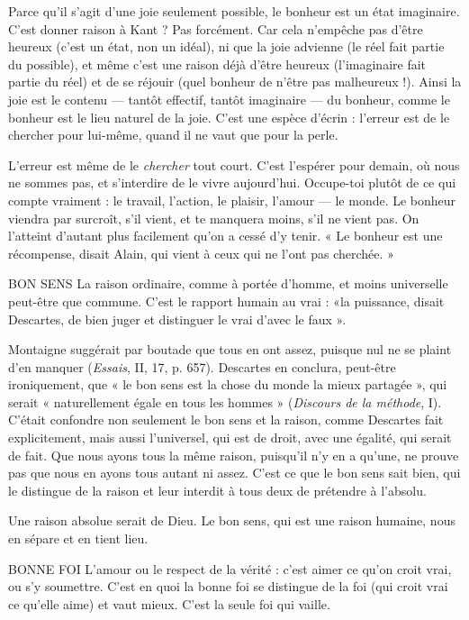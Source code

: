 Parce qu’il s’agit d’une joie seulement possible, le bonheur est un état imaginaire.
C’est donner raison à Kant ? Pas forcément. Car cela n’empêche pas
d’être heureux (c’est un état, non un idéal), ni que la joie advienne (le réel fait
partie du possible), et même c’est une raison déjà d’être heureux (l’imaginaire
fait partie du réel) et de se réjouir (quel bonheur de n’être pas malheureux !).
Ainsi la joie est le contenu — tantôt effectif, tantôt imaginaire — du bonheur,
comme le bonheur est le lieu naturel de la joie. C’est une espèce d’écrin :
l'erreur est de le chercher pour lui-même, quand il ne vaut que pour la perle.

L'erreur est même de le {\it chercher} tout court. C’est l’espérer pour demain,
où nous ne sommes pas, et s’interdire de le vivre aujourd’hui. Occupe-toi
plutôt de ce qui compte vraiment : le travail, l’action, le plaisir, l'amour — le
monde. Le bonheur viendra par surcroît, s’il vient, et te manquera moins, s’il
ne vient pas. On l’atteint d’autant plus facilement qu’on a cessé d’y tenir. « Le
bonheur est une récompense, disait Alain, qui vient à ceux qui ne l’ont pas
cherchée. »

BON SENS La raison ordinaire, comme à portée d’homme, et moins universelle
peut-être que commune. C’est le rapport humain au vrai :
«la puissance, disait Descartes, de bien juger et distinguer le vrai d’avec le
faux ».

Montaigne suggérait par boutade que tous en ont assez, puisque nul ne se
plaint d'en manquer ({\it Essais}, II, 17, p. 657). Descartes en conclura, peut-être
ironiquement, que « le bon sens est la chose du monde la mieux partagée », qui
serait « naturellement égale en tous les hommes » ({\it Discours de la méthode}, I).
C'était confondre non seulement le bon sens et la raison, comme Descartes fait
explicitement, mais aussi l’universel, qui est de droit, avec une égalité, qui serait
de fait. Que nous ayons tous la même raison, puisqu'il n’y en a qu’une, ne
prouve pas que nous en ayons tous autant ni assez. C’est ce que le bon sens sait
bien, qui le distingue de la raison et leur interdit à tous deux de prétendre à
l'absolu.

Une raison absolue serait de Dieu. Le bon sens, qui est une raison
humaine, nous en sépare et en tient lieu.

BONNE FOI  L’amour ou le respect de la vérité : c’est aimer ce qu’on croit
vrai, ou s’y soumettre. C’est en quoi la bonne foi se distingue
de la foi (qui croit vrai ce qu’elle aime) et vaut mieux. C’est la seule foi qui
vaille.

